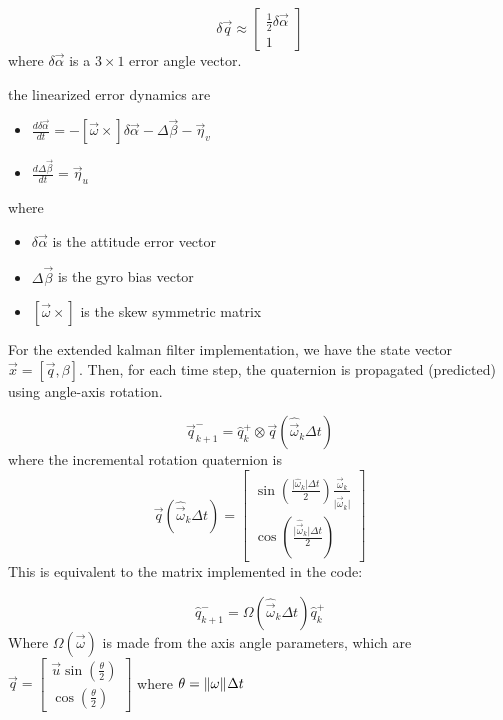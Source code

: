 \documentclass[12pt,A4, onecolumn]{exam}
\DeclarePairedDelimiter{\norm}{\lVert}{\rVert}
\begin{document}
\begin{questions}
\begin{solution}
  \[
      \delta \vec{q} \approx \begin{bmatrix}
          \frac{ 1 }{ 2 } \delta \vec{\alpha} \\ 1
      \end{bmatrix} 
  \]
  where $ \delta \vec{\alpha} $ is a $ 3\times 1$ error angle vector.
  
  the linearized error dynamics are
  \begin{itemize}
    \item $ \frac{ d \delta \vec{\alpha_{}^{} } }{ dt } = - \left[ \vec{\omega} \times \right] \delta \vec{\alpha_{}^{} } - \Delta \vec{\beta} - \vec{\eta}_v $
    \item $ \frac{ d \Delta \vec{\beta} }{ dt } = \vec{\eta}_u $ 
  \end{itemize}
  where \begin{itemize}
    \item $ \delta \vec{\alpha} $ is the attitude error vector
    \item $ \Delta \vec{\beta} $ is the gyro bias vector 
    \item $ \left[ \vec{\omega}  \times \right]  $ is the skew symmetric matrix  
  \end{itemize}


  For the extended kalman filter implementation, we have the state vector $ \vec{x} = \left[ \vec{q}, \beta \right] $. Then, for each time step, the quaternion is propagated (predicted) using angle-axis rotation.

  \[
      \vec{q}_{k+1}^- = \hat{q}_k^+ \otimes \vec{q}(\hat{ \vec{\omega}}_k \Delta t)
  \]
  where the incremental rotation quaternion is 
  \[
      \vec{q}(\hat{ \vec{\omega}}_k \Delta t) = \begin{bmatrix}
          \sin \left( \frac{ \lvert \hat{\omega}_k \rvert \Delta t }{ 2 } \right) \frac{ \hat{ \vec{\omega}}_k }{ \lvert \hat{ \vec{\omega}}_k \rvert } \\
          \cos \left( \frac{  \lvert \hat{ \vec{\omega}}_k \rvert \Delta t }{ 2 } \right) 
      \end{bmatrix} 
  \]
  This is equivalent to the matrix implemented in the code:

  \[
      \hat{ q}_{k+1}^- = \Omega \left( \hat{ \vec{\omega}}_k \Delta t \right) \hat{q}_k^+ 
  \]
  Where $ \Omega \left( \vec{\omega} \right)  $ is made from the axis angle parameters, which are $ \vec{q} = \begin{bmatrix}
      \vec{u} \sin \left( \frac{ \theta }{ 2 } \right) \\
      \cos \left(  \frac{ \theta }{ 2 } \right)  
  \end{bmatrix}  $ where $ \theta = \norm{\omega}_{}^{}  \Delta t$ 
  

\end{solution}
\end{questions}
\end{document}

